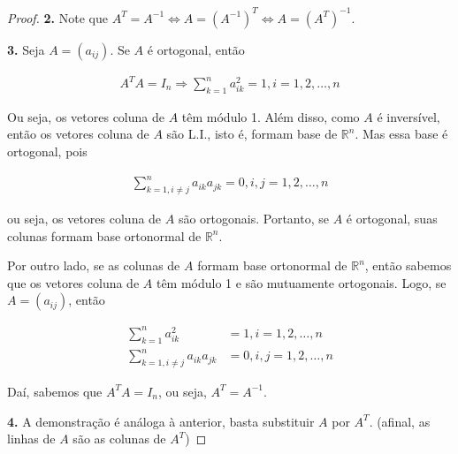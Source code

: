 \documentclass{article}
\begin{document}
\begin{proof}
	\textbf{2.} Note que $A^T = A^{-1}\Leftrightarrow A = (A^{-1})^T \Leftrightarrow A = (A^T)^{-1}$.
	
	\par\vspace{0.4cm}\hspace{16pt}\textbf{3.} Seja $A = (a_{ij})$. Se $A$ é ortogonal, então 
	
	\begin{align*}
	A^TA = I_n \Rightarrow \sum_{k = 1}^{n}a_{ik}^2 = 1, i=1,2,\dots,n
	\end{align*}
	
	\par\vspace{0.3cm} Ou seja, os vetores coluna de $A$ têm módulo 1. Além disso, como $A$ é inversível, então os vetores coluna de $A$ são L.I., isto é, formam base de $\mathbb{R}^n$. Mas essa base é ortogonal, pois 
	
	\begin{align*}
	\sum_{k=1, i\neq j}^{n}a_{ik}a_{jk} = 0, i,j = 1, 2, \dots, n
	\end{align*}
	
	\par\vspace{0.3cm} ou seja, os vetores coluna de $A$ são ortogonais. Portanto, se $A$ é ortogonal, suas colunas formam base ortonormal de $\mathbb{R}^n$.
	
	\par\vspace{0.3cm} Por outro lado, se as colunas de $A$ formam base ortonormal de $\mathbb{R}^n$, então sabemos que os vetores coluna de $A$ têm módulo 1 e são mutuamente ortogonais. Logo, se $A = (a_{ij})$, então
	
	\begin{align*}
	\sum_{k = 1}^{n}a_{ik}^2 &= 1, i=1,2,\dots,n \\
	\sum_{k = 1, i\neq j}^{n}a_{ik}a_{jk} &= 0, i,j=1,2,\dots,n
	\end{align*}
	
	\par\vspace{0.3cm} Daí, sabemos que $A^TA = I_n$, ou seja, $A^T = A^{-1}$.
	
	\par\vspace{0.4cm}\hspace{16pt}\textbf{4.} A demonstração é análoga à anterior, basta substituir $A$ por $A^T$. (afinal, as linhas de $A$ são as colunas de $A^T$)
	
\end{proof}
\end{document}
